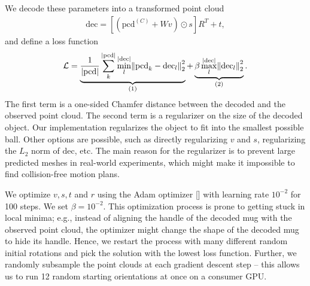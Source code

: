 \documentclass{article}
\newcommand{\rob}[1]{\textcolor{green}{[\textbf{rob:} #1]}}
\newcommand{\tk}[1]{\textcolor{magenta}{[\textbf{TK:} #1]}}
\newcommand{\pcx}[1]{\mathrm{pcd}^{(#1)}}
\newcommand{\pcc}{\pcx{C}}
\begin{document}
We decode these parameters into a transformed point cloud
\begin{align}
    \mathrm{dec} = [(\pcc + W v) \odot s] R^T + t,
\end{align}
and define a loss function
\begin{align}
    \mathcal{L} = \underbrace{\frac{1}{|\mathrm{pcd}|} \sum_k^{|\mathrm{pcd}|} \min_l^{|\mathrm{dec}|} \norm{\mathrm{pcd}_k - \mathrm{dec}_l}_2^2}_{\text{(1)}} + \underbrace{\beta \max_l^{|\mathrm{dec}|} \norm{\mathrm{dec}_l}_2^2}_{\text{(2)}}.
\end{align}
The first term is a one-sided Chamfer distance between the decoded and the observed point cloud. The second term is a regularizer on the size of the decoded object. Our implementation regularizes the object to fit into the smallest possible ball. Other options are possible, such as directly regularizing $v$ and $s$, regularizing the $L_2$ norm of $\mathrm{dec}$, etc. The main reason for the regularizer is to prevent large predicted meshes in real-world experiments, which might make it impossible to find collision-free motion plans.

We optimize $v, s, t$ and $r$ using the Adam optimizer [] with learning rate $10^{-2}$ for 100 steps. We set $\beta=10^{-2}$. This optimization process is prone to getting stuck in local minima; e.g., instead of aligning the handle of the decoded mug with the observed point cloud, the optimizer might change the shape of the decoded mug to hide its handle. Hence, we restart the process with many different random initial rotations and pick the solution with the lowest loss function. Further, we randomly subsample the point clouds at each gradient descent step -- this allows us to run 12 random starting orientations at once on a consumer GPU.



\end{document}
